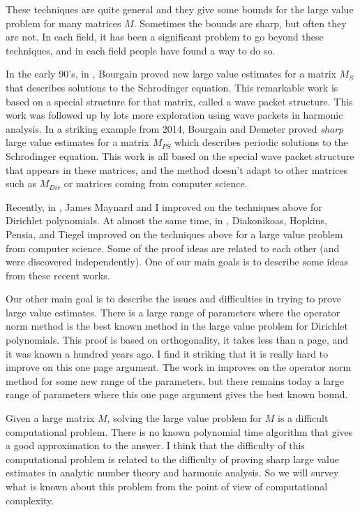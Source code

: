 \documentclass{amsart}
\begin{document}
These techniques are quite general and they give some bounds for the large value problem for many matrices $M$.  Sometimes the bounds are sharp, but often they are not.  In each field, it has been a significant problem to go beyond these techniques,  and in each field people have found a way to do so.  

 In the early 90's,  in \cite{B3},  Bourgain proved new large value estimates for a matrix $M_{S}$ that describes solutions to the Schrodinger equation.  
  This remarkable work is based on a special structure for that matrix,  called a wave packet structure.   This work was followed up by lots more exploration using wave packets in harmonic analysis.   In a striking example from 2014, Bourgain and Demeter \cite{BD} proved {\it sharp} large value estimates for a matrix $M_{PS}$ which describes periodic solutions to the Schrodinger equation.  This work is all based on the special wave packet structure that appears in these matrices,  and the method doesn't adapt to other matrices such as $M_{Dir}$ or matrices coming from computer science.  

Recently, in \cite{GM}, James Maynard and I  improved on the techniques above for Dirichlet polynomials.  At almost the same time, in \cite{DHPT},  Diakonikoas, Hopkins, Pensia, and Tiegel improved on the techniques above for a large value problem from computer science.  Some of the proof ideas are related to each other (and were discovered independently).  One of our main goals is to describe some ideas from these recent works.

Our other main goal is to describe the issues and difficulties in trying to prove large value estimates.  There is a large range of parameters where the operator norm method is the best known method in the large value problem for Dirichlet polynomials.  This proof is based on orthogonality, it takes less than a page, and it was known a hundred years ago.  I find it striking that it is really hard to improve on this one page argument.  The work in \cite{GM} improves on the operator norm method for some new range of the parameters, but there remains today a large range of parameters where this one page argument gives the best known bound.

Given a large matrix $M$,  solving the large value problem for $M$ is a difficult computational problem.   There is no known polynomial time algorithm that gives a good approximation to the answer.   I think that the difficulty of this computational problem is related to the difficulty of proving sharp large value estimates in analytic number theory and harmonic analysis.   So we will survey what is known about this problem from the point of view of computational complexity. 
\end{document}
